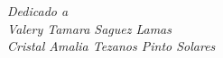\chapter*{}
\begin{flushright}
\textit{Dedicado a \\
    Valery Tamara Saguez Lamas \\
    Cristal Amalia Tezanos Pinto Solares\dag}
    \end{flushright}
\newpage
